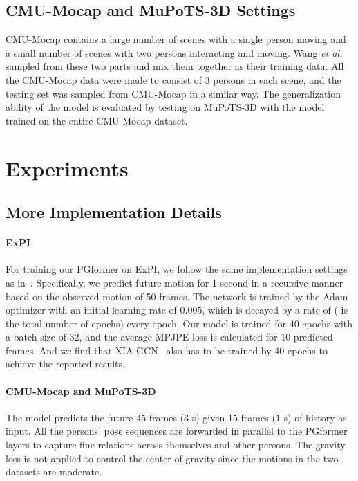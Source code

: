 \documentclass[10pt,twocolumn,letterpaper]{article}
\begin{document}
\subsection{CMU-Mocap and MuPoTS-3D Settings}
CMU-Mocap contains a large number of scenes with a single person moving and a small number of scenes with two persons interacting and moving. 
Wang \textit{et al.}~\cite{wang2021multiperson} sampled from these two parts and mix them together as their training data.
All the CMU-Mocap data were made to consist of 3 persons in each scene, and the testing set was sampled from CMU-Mocap in a similar way. 
The generalization ability of the model is evaluated by testing on MuPoTS-3D with the model trained on the entire CMU-Mocap dataset.

\section{Experiments}
\label{app_sec:exp}




\subsection{More Implementation Details}
\label{app_subsec:implement}
\paragraph{ExPI} 
For training our PGformer on ExPI, we follow the same implementation settings as in~\cite{guo2021multi}. 
Specifically, we predict future motion for 1 second in a recursive manner based on the observed motion of 50 frames. 
The network is trained by the Adam optimizer with an initial learning rate of 0.005, which is decayed by a rate of  ( is the total number of epochs) every epoch. 
Our model is trained for 40 epochs with a batch size of 32, and the average MPJPE loss is calculated for 10 predicted frames. 
And we find that XIA-GCN~\cite{guo2021multi} also has to be trained by 40 epochs to achieve the reported results. 

\paragraph{CMU-Mocap and MuPoTS-3D} 
The model predicts the future 45 frames (3 s) given 15 frames (1 s) of history as input. 
All the persons' pose sequences are forwarded in parallel to the PGformer layers to capture fine relations across themselves and other persons. 
The gravity loss is not applied to control the center of gravity since the motions in the two datasets are moderate. 
\end{document}
